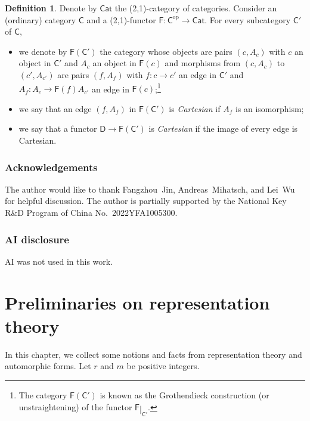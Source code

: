 \documentclass[12pt]{amsart}
\numberwithin{equation}{section}
\theoremstyle{plain}
\theoremstyle{definition}
\newtheorem{definition}[proposition]{Definition}
\theoremstyle{remark}
\renewcommand{\r}[1]{\mathrm{#1}}
\renewcommand{\sf}[1]{\mathsf{#1}}
\renewcommand{\(}{\left(}
\renewcommand{\)}{\right)}
\newcommand{\res}{\mathbin{|}}
\newcommand{\sfC}{\sf C}
\newcommand{\sfD}{\sf D}
\newcommand{\sfF}{\sf F}
\newcommand{\op}{\r{op}}
\newcommand{\Cat}{\sf{Cat}}
\begin{document}
\begin{definition}\label{de:category_section}
Denote by $\Cat$ the (2,1)-category of categories. Consider an (ordinary) category $\sfC$ and a (2,1)-functor $\sfF\colon\sfC^\op\to\Cat$. For every subcategory $\sfC'$ of $\sfC$,
\begin{itemize}
  \item we denote by $\sfF(\sfC')$ the category whose objects are pairs $(c,A_c)$ with $c$ an object in $\sfC'$ and $A_c$ an object in $\sfF(c)$ and morphisms from $(c,A_c)$ to $(c',A_{c'})$ are pairs $(f,A_f)$ with $f\colon c\to c'$ an edge in $\sfC'$ and $A_f\colon A_c\to \sfF(f)A_{c'}$ an edge in $\sfF(c)$;\footnote{The category $\sfF(\sfC')$ is known as the Grothendieck construction (or unstraightening) of the functor $\sfF\res_{\sfC'}$.}

  \item we say that an edge $(f,A_f)$ in $\sfF(\sfC')$ is \emph{Cartesian} if $A_f$ is an isomorphism;

  \item we say that a functor $\sfD\to\sfF(\sfC')$ is \emph{Cartesian} if the image of every edge is Cartesian.
\end{itemize}
\end{definition}



\subsubsection*{Acknowledgements}


The author would like to thank Fangzhou~Jin, Andreas~Mihatsch, and Lei~Wu for helpful discussion. The author is partially supported by the National Key R\&D Program of China No.~2022YFA1005300.



\subsubsection*{AI disclosure}

AI was not used in this work.




\section{Preliminaries on representation theory}
\label{ss:2}

In this chapter, we collect some notions and facts from representation theory and automorphic forms. Let $r$ and $m$ be positive integers.
\end{document}

